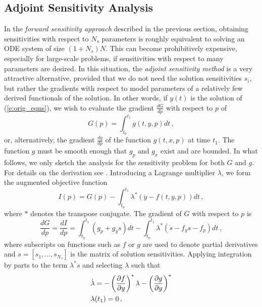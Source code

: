 \subsection{Adjoint Sensitivity Analysis}\label{ss:adj_sensi}
In the {\em forward sensitivity approach} described in the previous
section, obtaining sensitivities with respect to $N_s$ parameters is roughly
equivalent to solving an ODE system of size $(1+N_s) N$. This can become 
prohibitively expensive, especially for large-scale problems, if sensitivities
with respect to many parameters are desired.
In this situation, the {\em adjoint sensitivity method} is a very
attractive alternative, provided that we do not need the solution sensitivities
$s_i$, but rather the gradients with respect to model parameters of a relatively 
few derived functionals of the solution. In other words, if $y(t)$ is the solution
of (\ref{e:orig_eqns}), we wish to evaluate the gradient $\frac{dG}{dp}$ 
with respect to $p$ of
\begin{equation}\label{e:G}
G(p) = \int_{t_0}^{t_1} g(t, y, p) dt \, ,
\end{equation}
or, alternatively, the gradient $\frac{dg}{dp}$ of the function $g(t, x, p)$ 
at time $t_1$. The function $g$ must be smooth enough that $g_p$ and $g_x$ 
exist and are bounded. In what follows, we only sketch the analysis for the 
sensitivity problem for both $G$ and $g$.
For details on the derivation see \cite{CLPS02}.
Introducing a Lagrange multiplier $\lambda$, we form the augmented
objective function
\begin{equation}
I(p) = G(p) - \int_{t_0}^{t_1} \lambda^* 
\left( {\dot y} - f(t,y,p)\right) dt \, ,
\end{equation}
where $*$ denotes the transpose conjugate. The gradient of $G$ with respect to $p$ is
\begin{equation}
  \frac{dG}{dp} = \frac{dI}{dp} 
=\int_{t_0}^{t_1}(g_p + g_y s)dt - \int_{t_0}^{t_1} 
\lambda^* \left( {\dot s} - f_y s - f_p \right)dt \, ,
\end{equation}
where subscripts on functions such as $f$ or $g$ are used to denote partial 
derivatives and $s = [s_1,\ldots,s_{N_s}]$ is the matrix of solution sensitivities.
Applying integration by parts to the term $\lambda^* {\dot s}$ and selecting
$\lambda$ such that
\begin{equation}\label{e:adj_eqns}
\begin{split}
&{\dot \lambda} = -\left( \frac{\partial f}{\partial y} \right)^* \lambda - 
\left( \frac{\partial g}{\partial y} \right)^* \\
&\lambda(t_1) = 0 \, ,
\end{split}
\end{equation}
